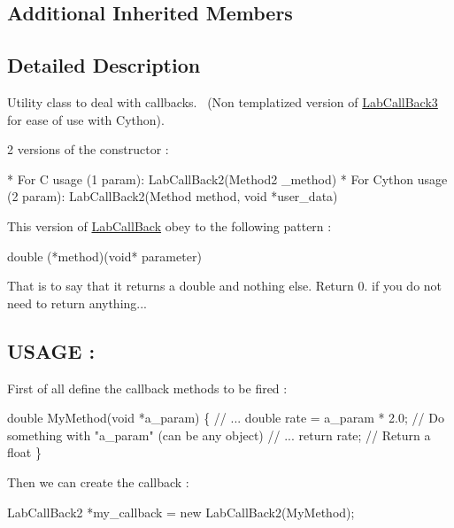 \subsection*{Additional Inherited Members}


\subsection{Detailed Description}
Utility class to deal with callbacks.~\newline
 (Non templatized version of \hyperlink{classelps_1_1_lab_call_back3}{Lab\+Call\+Back3} for ease of use with Cython).

2 versions of the constructor \+: \begin{DoxyVerb}   * For C usage (1 param): LabCallBack2(Method2 _method)
* For Cython usage (2 param): LabCallBack2(Method method, void *user_data)
\end{DoxyVerb}


This version of \hyperlink{classelps_1_1_lab_call_back}{Lab\+Call\+Back} obey to the following pattern \+: \begin{DoxyVerb}    double (*method)(void* parameter)
\end{DoxyVerb}


That is to say that it returns a double and nothing else. Return 0. if you do not need to return anything...

\subsection*{U\+S\+A\+G\+E \+: }

First of all define the callback methods to be fired \+:


\begin{DoxyCode}
\textcolor{keywordtype}{double} MyMethod(\textcolor{keywordtype}{void} *a\_param)
\{
        \textcolor{comment}{// ...}
        \textcolor{keywordtype}{double} rate = a\_param * 2.0;                 \textcolor{comment}{// Do something with "a\_param" (can be any object)}
        \textcolor{comment}{// ...}
        \textcolor{keywordflow}{return} rate;                                 \textcolor{comment}{// Return a float}
\}
\end{DoxyCode}


Then we can create the callback \+:


\begin{DoxyCode}
LabCallBack2 *my\_callback = \textcolor{keyword}{new} LabCallBack2(MyMethod);
\end{DoxyCode}


